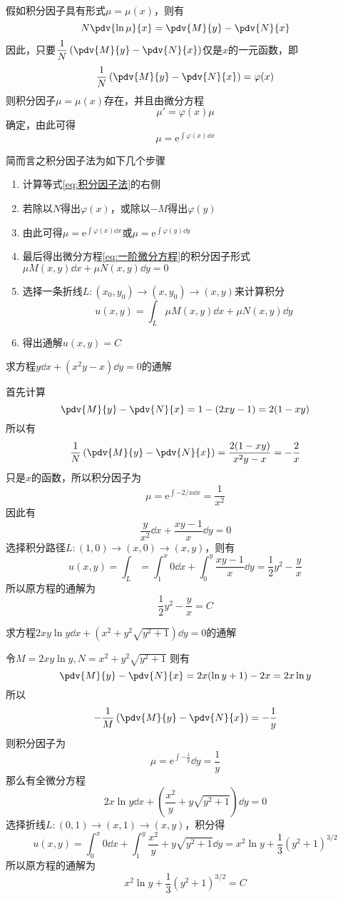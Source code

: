 假如积分因子具有形式$\mu=\mu(x)$，则有
\[ N\pdv{\ln\mu}{x} = \pdv{M}{y} - \pdv{N}{x} \]
因此，只要$\displaystyle \frac{1}{N}\left(\pdv{M}{y}-\pdv{N}{x}\right)$仅是$x$的一元函数，即
\[ \frac{1}{N}\left(\pdv{M}{y}-\pdv{N}{x}\right) = \varphi(x) \]
则积分因子$\mu=\mu(x)$存在，并且由微分方程
\[ \mu'=\varphi(x)\mu \]
确定，由此可得
\[ \mu = \mathrm{e}^{\int \varphi(x)\dd{x}} \]

简而言之积分因子法为如下几个步骤
\begin{enumerate}
    \item 计算等式\ref{eq:积分因子法}的右侧
    \item 若除以$N$得出$\varphi(x)$，或除以$-M$得出$\varphi(y)$
    \item 由此可得$\mu = \mathrm{e}^{\int \varphi(x) \dd{x}}$或$\mu = \mathrm{e}^{\int \varphi(y) \dd{y}}$
    \item 最后得出微分方程\ref{eq:一阶微分方程}的积分因子形式$\mu M(x,y)\dd{x} + \mu N(x,y)\dd{y} = 0$
    \item 选择一条折线$L:(x_0,y_0)\to(x,y_0)\to(x,y)$来计算积分\[u(x,y) = \int_L \mu M(x,y)\dd{x} + \mu N(x,y)\dd{y}\]
    \item 得出通解$u(x,y)=C$
\end{enumerate}
\begin{example}
    求方程$y\dd{x}+(x^2y-x)\dd{y}=0$的通解
\end{example}
\begin{solution}
    首先计算
    \[ \pdv{M}{y}-\pdv{N}{x} = 1 - (2xy - 1) = 2(1-xy) \]
    所以有
    \[ \frac{1}{N}\left(\pdv{M}{y}-\pdv{N}{x}\right) = \frac{2(1-xy)}{x^2y-x} = -\frac{2}{x} \]
    只是$x$的函数，所以积分因子为
    \[ \mu = \mathrm{e}^{\int -2/x\dd{x}} = \frac{1}{x^2}  \]
    因此有
    \[ \frac{y}{x^2}\dd{x} + \frac{xy-1}{x}\dd{y} = 0 \]
    选择积分路径$L:(1,0)\to(x,0)\to(x,y)$，则有
    \[ u(x,y) = \int_L = \int_1^x 0 \dd{x} + \int_0^y \frac{xy-1}{x}\dd{y} = \frac{1}{2}y^2-\frac{y}{x}  \]
    所以原方程的通解为
    \[ \frac{1}{2}y^2-\frac{y}{x} = C \]
\end{solution}

\begin{example}
    求方程$2xy\ln y\dd{x} + (x^2+y^2\sqrt{y^2+1})\dd{y}=0$的通解
\end{example}
\begin{solution}
    令$M = 2xy\ln y, N = x^2+y^2\sqrt{y^2+1}$
    则有
    \[ \pdv{M}{y} - \pdv{N}{x} = 2x(\ln y + 1) - 2x = 2x\ln y \]
    所以
    \[ -\frac{1}{M}\left(\pdv{M}{y} - \pdv{N}{x}\right) = -\frac{1}{y} \]
    则积分因子为
    \[ \mu = \mathrm{e}^{\int -\frac{1}{y}} \dd{y} = \frac{1}{y} \]
    那么有全微分方程
    \[ 2x\ln y\dd{x} + \left(\frac{x^2}{y} + y\sqrt{y^2+1}\right)\dd{y}=0 \]
    选择折线$L:(0,1)\to(x,1)\to(x,y)$，积分得
    \[ u(x,y) = \int_0^x 0\dd{x} + \int_1^y \frac{x^2}{y} + y\sqrt{y^2+1} \dd{y} = x^2\ln y + \frac{1}{3}(y^2+1)^{3/2} \]
    所以原方程的通解为
    \[ x^2\ln y + \frac{1}{3}(y^2+1)^{3/2} = C \]
\end{solution}

